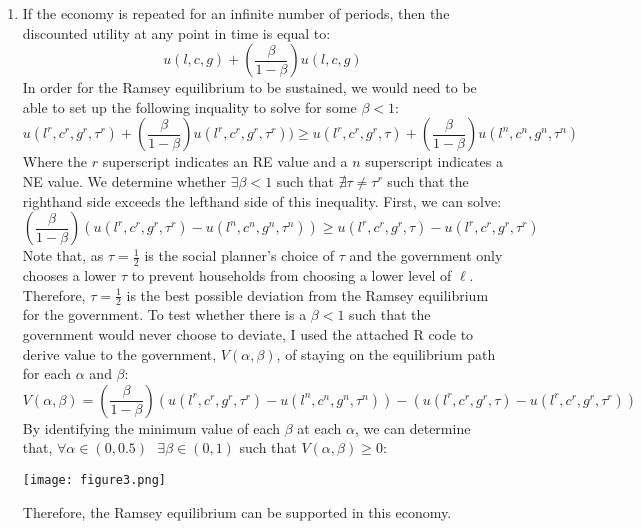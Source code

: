 \documentclass{article}
\begin{document}
\begin{enumerate}
	\item If the economy is repeated for an infinite number of periods, then the discounted utility at any point in time is equal to:
		\[
			u(l,c,g) + \left(\frac{\beta}{1-\beta}\right)u(l,c,g)
		\]
		In order for the Ramsey equilibrium to be sustained, we would need to be able to set up the following inquality to solve for some $\beta<1$:
		\[
			u(l^r,c^r,g^r,\tau^r) + \left(\frac{\beta}{1-\beta}\right)u(l^r,c^r,g^r,\tau^r))\geq 
			u(l^r,c^r,g^r,\tau) + \left(\frac{\beta}{1-\beta}\right)u(l^n,c^n,g^n,\tau^n)
		\]
		Where the $r$ superscript indicates an RE value and a $n$ superscript indicates a NE value. We determine whether $\exists\beta<1$ such that $\nexists\tau\neq\tau^r$ such that the righthand side exceeds the lefthand side of this inequality. First, we can solve:
		\[
			\left(\frac{\beta}{1-\beta}\right)\left(u(l^r,c^r,g^r,\tau^r)-u(l^n,c^n,g^n,\tau^n)\right)\geq u(l^r,c^r,g^r,\tau)-u(l^r,c^r,g^r,\tau^r)
		\]	
		Note that, as $\tau=\frac{1}{2}$ is the social planner's choice of $\tau$ and the government only chooses a lower $\tau$ to prevent households from choosing a lower level of $\ell$. Therefore, $\tau=\frac{1}{2}$ is the best possible deviation from the Ramsey equilibrium for the government. To test whether there is a $\beta<1$ such that the government would never choose to deviate, I used the attached R code to derive value to the government, $V(\alpha,\beta)$, of staying on the equilibrium path for each $\alpha$ and $\beta$:
		\[
			V(\alpha,\beta)=\left(\frac{\beta}{1-\beta}\right)\left(u(l^r,c^r,g^r,\tau^r)-u(l^n,c^n,g^n,\tau^n)\right)-\left(u(l^r,c^r,g^r,\tau)-u(l^r,c^r,g^r,\tau^r)\right)
		\]
		By identifying the minimum value of each $\beta$ at each $\alpha$, we can determine that, ${\forall\alpha\in(0,0.5)\text{ }\exists\beta\in(0,1)}$ such that ${V(\alpha,\beta)\geq0}$:
		\begin{center}
			\texttt{[image: figure3.png]}
		\end{center}
		Therefore, the Ramsey equilibrium can be supported in this economy.
		
\end{enumerate}


\end{document}
